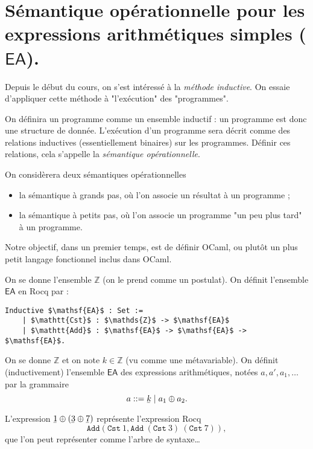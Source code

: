 \documentclass[../main]{subfiles}
\begin{document}
  \chapter{Sémantique opérationnelle pour les expressions arithmétiques simples ($\mathsf{EA}$).} \label{thprog-chap04}
  \minitoc

  Depuis le début du cours, on s'est intéressé à la \textit{méthode inductive}.
  On essaie d'appliquer cette méthode à "l'exécution" des "programmes".

  On définira un programme comme un ensemble inductif : un programme est donc une structure de donnée.
  L'exécution d'un programme sera décrit comme des relations inductives (essentiellement binaires) sur les programmes.
  Définir ces relations, cela s'appelle la \textit{sémantique opérationnelle}.

  On considèrera deux sémantiques opérationnelles
  \begin{itemize}
    \item la sémantique à grands pas, où l'on associe un résultat à un programme ;
    \item la sémantique à petits pas, où l'on associe un programme "un peu plus tard" à un programme.
  \end{itemize}

  Notre objectif, dans un premier temps, est de définir OCaml, ou plutôt un plus petit langage fonctionnel inclus dans OCaml.

  On se donne l'ensemble $\mathds{Z}$ (on le prend comme un postulat).
  On définit l'ensemble $\mathsf{EA}$ en Rocq par :
  \begin{lstlisting}[language=coq,caption=Définition des expressions arithmétiques simples]
    Inductive $\mathsf{EA}$ : Set :=
    | $\mathtt{Cst}$ : $\mathds{Z}$ -> $\mathsf{EA}$
    | $\mathtt{Add}$ : $\mathsf{EA}$ -> $\mathsf{EA}$ -> $\mathsf{EA}$.
  \end{lstlisting}

  \begin{note}
    On se donne $\mathds{Z}$ et on note $k \in \mathds{Z}$ (vu comme une métavariable).
    On définit (inductivement) l'ensemble $\mathsf{EA}$ des expressions arithmétiques, notées $a, a', a_1, \ldots$ par la grammaire
    \[
      a ::= \ubar{k}  \mid a_1 \oplus a_2
    .\] 
  \end{note}

  \begin{exm}
    L'expression $\ubar 1 \oplus (\ubar 3 \oplus \ubar 7)$ représente l'expression Rocq 
    \[
    \mathtt{Add}(\mathtt{Cst}\ 1, \mathtt{Add}\ (\mathtt{Cst}\ 3)\ (\mathtt{Cst}\ 7))
    ,\]
    que l'on peut représenter comme l'arbre de syntaxe\ldots
  \end{exm}
\end{document}
